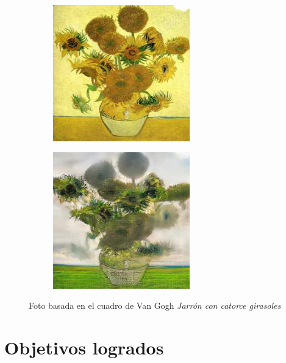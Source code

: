\documentclass[[../main.tex]{subfiles}
\begin{document}
        \begin{figure}[!htb]
            \begin{subfigure}[b]{0.49\textwidth}
            \includegraphics[width=0.65\textwidth]{imagenes/cuadro2imagen/vangogh/00180.jpg}
            \end{subfigure}
        \hfill
            \begin{subfigure}[b]{0.49\textwidth}
            \includegraphics[width=0.65\textwidth]{imagenes/cuadro2imagen/vangogh/00180_2.jpg}
            \end{subfigure}
        \caption{Foto basada en el cuadro de Van Gogh \textit{Jarrón con catorce girasoles}}
        \label{fig:vangogh_foto_girasoles}
        \end{figure}

\newpage

\section{Objetivos logrados}
\end{document}
